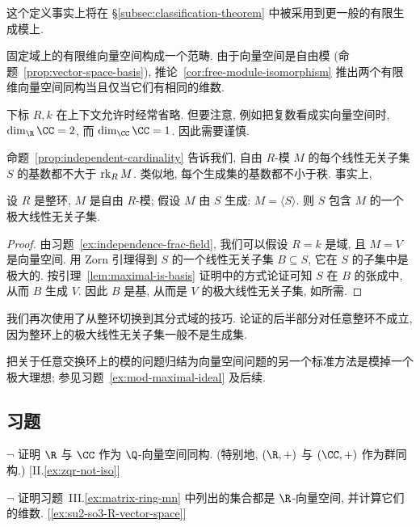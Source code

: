 这个定义事实上将在 §\ref{subsec:classification-theorem} 中被采用到更一般的有限生成模上.

固定域上的有限维向量空间构成一个范畴. 由于向量空间是自由模 (命题~\ref{prop:vector-space-basis}), 推论~\ref{cor:free-module-isomorphism} 推出两个有限维向量空间同构当且仅当它们有相同的维数.

下标 $R,k$ 在上下文允许时经常省略. 但要注意, 例如把复数看成实向量空间时, $\Dim_\R\CC=2$, 而 $\Dim_\CC\CC=1$. 因此需要谨慎.

命题~\ref{prop:independent-cardinality} 告诉我们, 自由 $R$-模 $M$ 的每个线性无关子集 $S$ 的基数都不大于 $\operatorname{rk}_R M$. 类似地, 每个生成集的基数都不小于秩. 事实上,

\begin{proposition}\label{prop:generating-contains-basis}
设 $R$ 是整环, $M$ 是自由 $R$-模; 假设 $M$ 由 $S$ 生成: $M=\langle S\rangle$. 则 $S$ 包含 $M$ 的一个极大线性无关子集.
\end{proposition}

\begin{proof}
由习题~\ref{ex:independence-frac-field}, 我们可以假设 $R=k$ 是域, 且 $M=V$ 是向量空间. 用 Zorn 引理得到 $S$ 的一个线性无关子集 $B\subseteq S$, 它在 $S$ 的子集中是极大的. 按引理~\ref{lem:maximal-is-basis} 证明中的方式论证可知 $S$ 在 $B$ 的张成中, 从而 $B$ 生成 $V$. 因此 $B$ 是基, 从而是 $V$ 的极大线性无关子集, 如所需.
\end{proof}

\begin{remark}\label{rmk:frac-field-trick-again}
我们再次使用了从整环切换到其分式域的技巧. 论证的后半部分对任意整环不成立, 因为整环上的极大线性无关子集一般不是生成集.
\end{remark}

把关于任意交换环上的模的问题归结为向量空间问题的另一个标准方法是模掉一个极大理想; 参见习题~\ref{ex:mod-maximal-ideal} 及后续.

\subsection*{习题}
{}

\begin{prob}
\label{ex:RC-Q-vector-space}
$\neg$ 证明 $\R$ 与 $\CC$ 作为 $\Q$-向量空间同构. (特别地, $(\R,+)$ 与 $(\CC,+)$ 作为群同构.) [II.\ref{ex:zqr-not-iso}]
\end{prob}

\begin{prob}
\label{ex:dimensions-III-1-4}
$\neg$ 证明习题~III.\ref{ex:matrix-ring-mn} 中列出的集合都是 $\R$-向量空间, 并计算它们的维数. [\ref{ex:su2-so3-R-vector-space}]
\end{prob}

